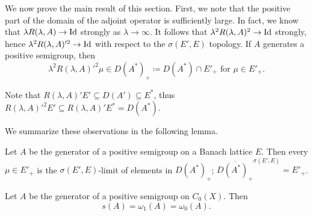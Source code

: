 We now prove the main result of this section. 
First, we note that the positive part of the domain of the adjoint operator is sufficiently large. 
In fact, we know that $\lambda R(\lambda,A) \to \operatorname{Id} $ strongly as $\lambda \to \infty$. 
It follows that $\lambda^2R(\lambda,A)^2 \to \operatorname{Id} $ strongly, hence $\lambda^2R(\lambda,A)'^2 \to \operatorname{Id} $ with respect to the $\sigma(E',E)$ topology. 
If\/ $A$ generates a positive semigroup, then 
\[
\lambda^2R(\lambda,A)'^2\mu \in D(A^*)_{+} \coloneq D(A^*)\cap E'_{+}
\text{ for }
\mu \in E'_+
. 
\]

Note that $R(\lambda,A)'E' \subseteq D(A') \subseteq E^*$, thus \,$R(\lambda,A)'^2E' \subseteq R(\lambda,A)'E^* = D(A^*)$.

We summarize these observations in the following lemma.
\begin{lemma}\label{lem:b4-1.3}%
Let $A$ be the generator of a positive semigroup on a Banach lattice $E$. Then every $\mu \in E'_+$ is the $\sigma(E',E)$-limit of elements in $D(A^*)_{+}$; \ie $\overline{D(A^*)_+}^{\sigma(E',E)} = E'_+$.
\end{lemma}
\begin{theorem}\label{thm:b4-1.4}%
Let $A$ be the generator of a positive semigroup on $C_{0}(X)$. 
Then
\[
   s(A) = \omega_1(A) = \omega_{0}(A).%
\]
\end{theorem}
